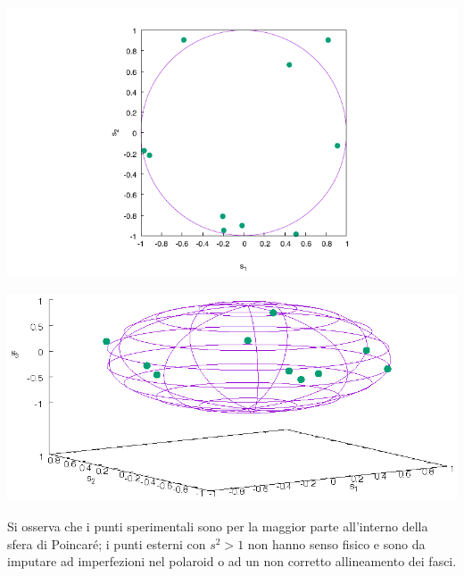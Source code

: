 \documentclass[10pt,oneside,a4paper]{article}
\newenvironment{Figure}
  {\par\medskip\noindent\minipage{\linewidth}}
  {\endminipage\par\medskip}
\begin{document}
\begin{multicols}{2}
\begin{Figure}
	\begin{center}
	\includegraphics[width=\linewidth]{piano}
	\label{fig:piano}
	\end{center}
\end{Figure}
\begin{Figure}
	\begin{center}
	\includegraphics[width=\linewidth]{spazio}
	\label{fig:spazio}
	\end{center}
\end{Figure}

Si osserva che i punti sperimentali sono per la maggior parte all'interno della sfera di Poincaré; i punti esterni con $s^2>1$ non hanno senso fisico e sono da imputare ad imperfezioni nel polaroid o ad un non corretto allineamento dei fasci.




\end{multicols}
\end{document}
